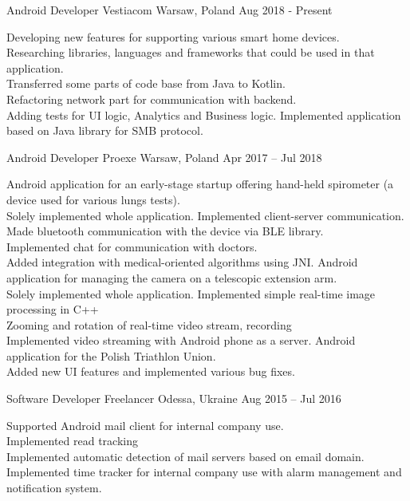 \begin{cventries}
  \cventry
    {Android Developer}
    {Vestiacom}
    {Warsaw, Poland}
    {Aug 2018 - Present}
    {
      \begin{cvitems}
         {
        Developing new features for supporting various smart home devices.\\
        Researching libraries, languages and frameworks that could be used in that application.\\
        Transferred some parts of code base from Java to Kotlin.\\
        Refactoring network part for communication with backend.\\
        Adding tests for UI logic, Analytics and Business logic.
        }
         {
        Implemented application based on Java library for SMB protocol.
        }
      \end{cvitems}
    }
  \cventry
    {Android Developer}
    {Proexe}
    {Warsaw, Poland}
    {Apr 2017 – Jul 2018}
    {
      \begin{cvitems}
         {
        Android application for an early-stage startup offering hand-held spirometer (a device used for various lungs tests).\\
        Solely implemented whole application. 
        Implemented client-server communication.\\
        Made bluetooth communication with the device via BLE library.\\
        Implemented chat for communication with doctors.\\ 
        Added integration with medical-oriented algorithms using JNI.
        }
         {
        Android application for managing the camera on a telescopic extension arm.\\
        Solely implemented whole application.
        Implemented simple real-time image processing in C++\\
        Zooming and rotation of real-time video stream, recording\\
        Implemented video streaming with Android phone as a server.
        }
         {
        Android application for the Polish Triathlon Union.\\
        Added new UI features and implemented various bug fixes.
        }
      \end{cvitems}
    }
  \cventry
    {Software Developer}
    {Freelancer}
    {Odessa, Ukraine}
    {Aug 2015 – Jul 2016}
    {
      \begin{cvitems}
         {
        Supported Android mail client for internal company use.\\
        Implemented read tracking\\
        Implemented automatic detection of mail servers based on email domain.
        }
         {
        Implemented time tracker for internal company use with alarm management and notification system.
        }
      \end{cvitems}
    }
\end{cventries}
